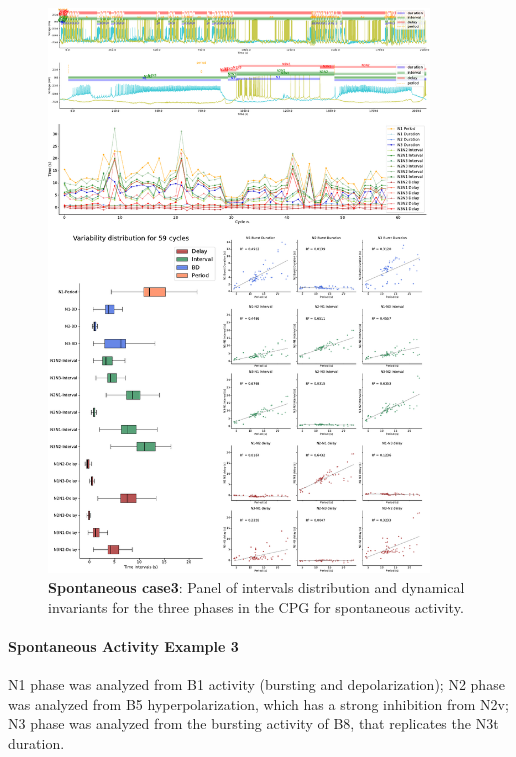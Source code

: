 \begin{figure}[htbp]
	\centering
	\includegraphics[width=0.9\textwidth]{./invariants/data/SUSSEX/prep3/images/3phases/panel_with_intervals.pdf}
	\caption{\textbf{Spontaneous case3}: Panel of intervals distribution and dynamical invariants for the three phases in the CPG for spontaneous activity.}
	\label{fig:prep3 invariants}
\end{figure}
%


\paragraph{Spontaneous Activity Example 3}
N1 phase was analyzed from B1 activity (bursting and depolarization); N2 phase was analyzed from B5 hyperpolarization, which has a strong inhibition from N2v; N3 phase was analyzed from the bursting activity of B8, that replicates the N3t duration. 

